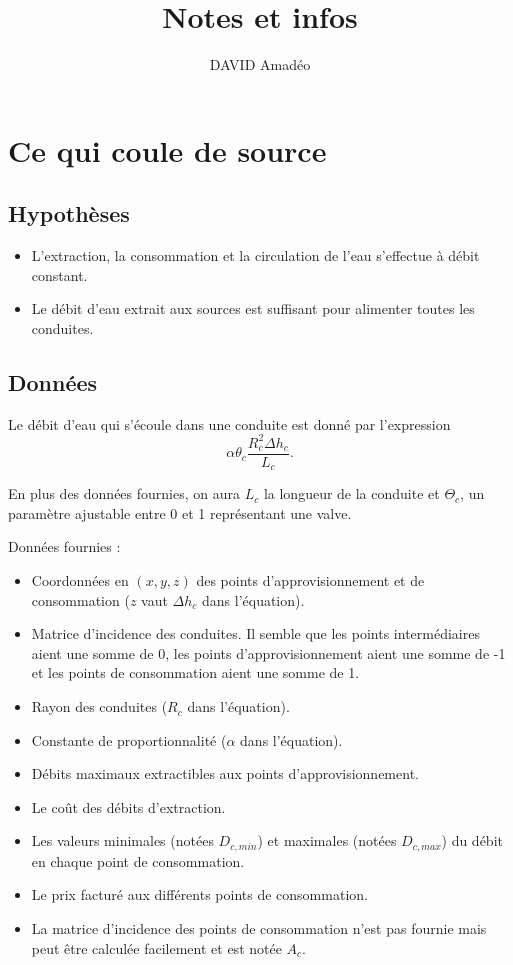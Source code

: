 \documentclass[french]{article}
\begin{document}
\title{Notes et infos}
\author{DAVID Amadéo}
\maketitle
\section{Ce qui coule de source}
\subsection{Hypothèses}
\begin{itemize}
	\item
		L'extraction, la consommation et la circulation de l'eau s'effectue à débit constant.
	\item
		Le débit d'eau extrait aux sources est suffisant pour alimenter toutes les conduites.
\end{itemize}
\subsection{Données}
Le débit d'eau qui s'écoule dans une conduite est donné par l'expression $$\alpha\theta_c\frac{R^2_c\Delta h_c}{L_c}.$$

En plus des données fournies, on aura $L_c$ la longueur de la conduite et $\Theta_c$, un paramètre ajustable entre 0 et 1 représentant une valve.

Données fournies :
\begin{itemize}
	\item 
		Coordonnées en $(x,y,z)$ des points d'approvisionnement et de consommation ($z$ vaut $\Delta h_c$ dans l'équation).
	\item 
		Matrice d'incidence des conduites.
		Il semble que les points intermédiaires aient une somme de 0, les points d'approvisionnement aient une somme de -1 et les points de consommation aient une somme de 1.
	\item
		Rayon des conduites ($R_c$ dans l'équation).
	\item
		Constante de proportionnalité ($\alpha$ dans l'équation).
	\item
		Débits maximaux extractibles aux points d'approvisionnement.
	\item 
		Le coût des débits d'extraction.
	\item 
		Les valeurs minimales (notées $D_{c,min}$) et maximales (notées $D_{c,max}$) du débit en chaque point de consommation.
	\item 
		Le prix facturé aux différents points de consommation.
	\item 
		La matrice d'incidence des points de consommation n'est pas fournie mais peut être calculée facilement et est notée $A_c$.
\end{itemize}
\end{document}
